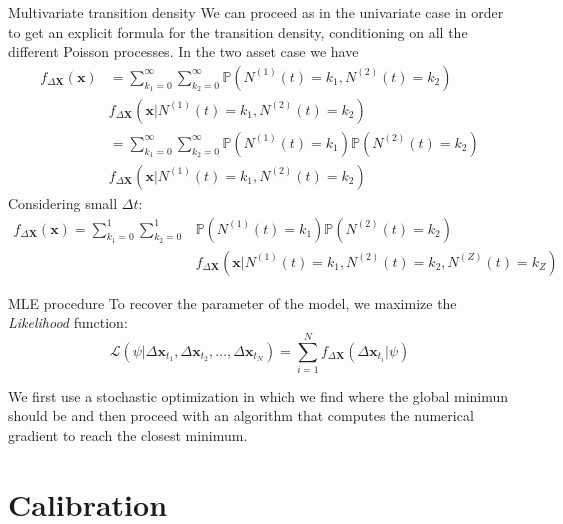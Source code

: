 \documentclass{beamer}
\begin{document}
\begin{frame}{Multivariate transition density}
We can proceed as in the univariate case in order to get an explicit formula for the transition density, conditioning on all the different Poisson processes. In the two asset case we have
\begin{equation*}
\begin{aligned}
    f_{\Delta\mathbf{X}}(\mathbf{x}) &= \sum_{k_1=0}^{\infty}\sum_{k_2=0}^{\infty} \mathbb{P}(N^{(1)}(t) = k_1, N^{(2)}(t)=k_2) \\
    &f_{\Delta\mathbf{X}}(\mathbf{x} | N^{(1)}(t) = k_1, N^{(2)}(t)=k_2)\\
    &= \sum_{k_1=0}^{\infty}\sum_{k_2=0}^{\infty}\mathbb{P}(N^{(1)}(t) = k_1) \mathbb{P}(N^{(2)}(t)=k_2)\\
    &f_{\Delta\mathbf{X}}(\mathbf{x} | N^{(1)}(t) = k_1, N^{(2)}(t)=k_2)
\end{aligned}
\end{equation*}
Considering small $\Delta t$:
\begin{equation*}
\begin{aligned}
        f_{\Delta\mathbf{X}}(\mathbf{x}) = \sum_{k_1=0}^{1}\sum_{k_2=0}^{1} &\mathbb{P}(N^{(1)}(t) = k_1) \mathbb{P}(N^{(2)}(t)=k_2)\\ &f_{\Delta\mathbf{X}}(\mathbf{x}| N^{(1)}(t) = k_1, N^{(2)}(t)=k_2, N^{(Z)}(t)=k_Z )
\end{aligned}
\end{equation*}

\end{frame}

\begin{frame}{MLE procedure}
To recover the parameter of the model, we maximize the \textit{Likelihood} function:
    \begin{equation}
    \mathcal{L}(\psi | \Delta \mathbf{x}_{t_1},\Delta \mathbf{x}_{t_2},\dots,\Delta \mathbf{x}_{t_N}) = \sum_{i=1}^{N} f_{\Delta \mathbf{X}}(\Delta\mathbf{x}_{t_i} | \psi)
\end{equation}

We first use a stochastic optimization in which we find where the global minimun should be and then proceed with an algorithm that computes the numerical gradient to reach the closest minimum.

\end{frame}


\section{Calibration}
\end{document}
